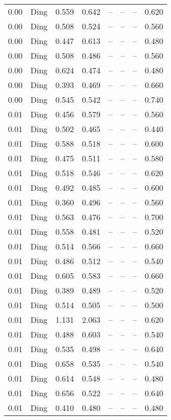 \begin{table}[H]
\begin{tabular}{l c l l l}
0.00 & Ding & 0.559 & 0.642 & -- & -- & -- & 0.620 \\
0.00 & Ding & 0.508 & 0.524 & -- & -- & -- & 0.560 \\
0.00 & Ding & 0.447 & 0.613 & -- & -- & -- & 0.480 \\
0.00 & Ding & 0.508 & 0.486 & -- & -- & -- & 0.560 \\
0.00 & Ding & 0.624 & 0.474 & -- & -- & -- & 0.480 \\
0.00 & Ding & 0.393 & 0.469 & -- & -- & -- & 0.660 \\
0.00 & Ding & 0.545 & 0.542 & -- & -- & -- & 0.740 \\
0.01 & Ding & 0.456 & 0.579 & -- & -- & -- & 0.560 \\
0.01 & Ding & 0.502 & 0.465 & -- & -- & -- & 0.440 \\
0.01 & Ding & 0.588 & 0.518 & -- & -- & -- & 0.600 \\
0.01 & Ding & 0.475 & 0.511 & -- & -- & -- & 0.580 \\
0.01 & Ding & 0.518 & 0.546 & -- & -- & -- & 0.620 \\
0.01 & Ding & 0.492 & 0.485 & -- & -- & -- & 0.600 \\
0.01 & Ding & 0.360 & 0.496 & -- & -- & -- & 0.560 \\
0.01 & Ding & 0.563 & 0.476 & -- & -- & -- & 0.700 \\
0.01 & Ding & 0.558 & 0.481 & -- & -- & -- & 0.520 \\
0.01 & Ding & 0.514 & 0.566 & -- & -- & -- & 0.660 \\
0.01 & Ding & 0.486 & 0.512 & -- & -- & -- & 0.540 \\
0.01 & Ding & 0.605 & 0.583 & -- & -- & -- & 0.660 \\
0.01 & Ding & 0.389 & 0.489 & -- & -- & -- & 0.520 \\
0.01 & Ding & 0.514 & 0.505 & -- & -- & -- & 0.500 \\
0.01 & Ding & 1.131 & 2.063 & -- & -- & -- & 0.620 \\
0.01 & Ding & 0.488 & 0.603 & -- & -- & -- & 0.540 \\
0.01 & Ding & 0.535 & 0.498 & -- & -- & -- & 0.640 \\
0.01 & Ding & 0.658 & 0.535 & -- & -- & -- & 0.540 \\
0.01 & Ding & 0.614 & 0.548 & -- & -- & -- & 0.480 \\
0.01 & Ding & 0.656 & 0.522 & -- & -- & -- & 0.640 \\
0.01 & Ding & 0.410 & 0.480 & -- & -- & -- & 0.480 \\

\end{tabular}
\end{table}
